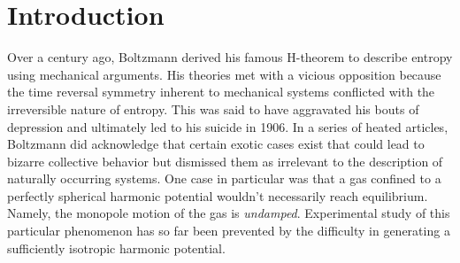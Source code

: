 \documentclass[%
 reprint,
 amsmath,amssymb,
 aps,
]{revtex4-1}
\begin{document}

\section{\label{sec:level1} Introduction}

Over a century ago, Boltzmann derived his famous H-theorem to describe entropy using mechanical arguments. His theories met with a vicious opposition because the time reversal symmetry inherent to mechanical systems conflicted with the irreversible nature of entropy. This was said to have aggravated his bouts of depression and ultimately led to his suicide in 1906. In a series of heated articles, Boltzmann did acknowledge that certain exotic cases exist that could lead to bizarre collective behavior but dismissed them as irrelevant to the description of naturally occurring systems. One case in particular was that a gas confined to a perfectly spherical harmonic potential wouldn't necessarily reach equilibrium. Namely, the monopole motion of the gas is \textit{undamped}. Experimental study of this particular phenomenon has so far been prevented by the difficulty in generating a sufficiently isotropic harmonic potential. 



\end{document}
